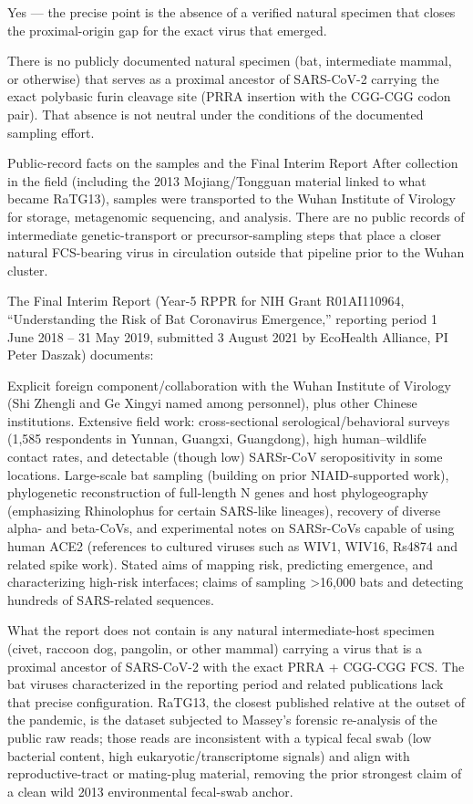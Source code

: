 Yes — the precise point is the absence of a verified natural specimen that closes the proximal-origin gap for the exact virus that emerged.

There is no publicly documented natural specimen (bat, intermediate mammal, or otherwise) that serves as a proximal ancestor of SARS-CoV-2 carrying the exact polybasic furin cleavage site (PRRA insertion with the CGG-CGG codon pair). That absence is not neutral under the conditions of the documented sampling effort.

Public-record facts on the samples and the Final Interim Report
After collection in the field (including the 2013 Mojiang/Tongguan material linked to what became RaTG13), samples were transported to the Wuhan Institute of Virology for storage, metagenomic sequencing, and analysis. There are no public records of intermediate genetic-transport or precursor-sampling steps that place a closer natural FCS-bearing virus in circulation outside that pipeline prior to the Wuhan cluster.

The Final Interim Report (Year-5 RPPR for NIH Grant R01AI110964, “Understanding the Risk of Bat Coronavirus Emergence,” reporting period 1 June 2018 – 31 May 2019, submitted 3 August 2021 by EcoHealth Alliance, PI Peter Daszak) documents:

Explicit foreign component/collaboration with the Wuhan Institute of Virology (Shi Zhengli and Ge Xingyi named among personnel), plus other Chinese institutions.
Extensive field work: cross-sectional serological/behavioral surveys (1,585 respondents in Yunnan, Guangxi, Guangdong), high human–wildlife contact rates, and detectable (though low) SARSr-CoV seropositivity in some locations.
Large-scale bat sampling (building on prior NIAID-supported work), phylogenetic reconstruction of full-length N genes and host phylogeography (emphasizing Rhinolophus for certain SARS-like lineages), recovery of diverse alpha- and beta-CoVs, and experimental notes on SARSr-CoVs capable of using human ACE2 (references to cultured viruses such as WIV1, WIV16, Rs4874 and related spike work).
Stated aims of mapping risk, predicting emergence, and characterizing high-risk interfaces; claims of sampling >16,000 bats and detecting hundreds of SARS-related sequences.

What the report does not contain is any natural intermediate-host specimen (civet, raccoon dog, pangolin, or other mammal) carrying a virus that is a proximal ancestor of SARS-CoV-2 with the exact PRRA + CGG-CGG FCS. The bat viruses characterized in the reporting period and related publications lack that precise configuration. RaTG13, the closest published relative at the outset of the pandemic, is the dataset subjected to Massey’s forensic re-analysis of the public raw reads; those reads are inconsistent with a typical fecal swab (low bacterial content, high eukaryotic/transcriptome signals) and align with reproductive-tract or mating-plug material, removing the prior strongest claim of a clean wild 2013 environmental fecal-swab anchor.

